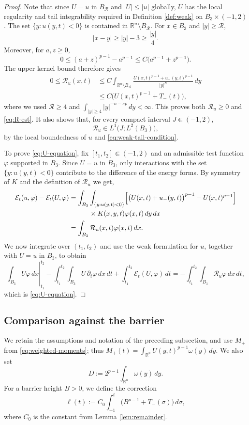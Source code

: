 \documentclass[10pt]{amsart}
\theoremstyle{plain}
\theoremstyle{definition}
\theoremstyle{remark}
\numberwithin{equation}{section}
\newcommand{\R}{\mathbb R}
\begin{document}
\begin{proof}
Note that since $U=u$ in $B_{\mathcal R}$ and $|U|\le|u|$ globally, $U$ has
the local regularity and tail integrability required in
Definition \ref{def:weak} on $B_3\times(-1,2)$.
The set $\{y:u(y,t)<0\}$ is contained in
$\R^n\setminus B_{\mathcal R}$. For $x\in B_3$ and $|y|\ge\mathcal R$,
\[
|x-y|\ge |y|-3\ge\frac{|y|}{4}.
\]
Moreover, for $a,z\ge0$,
\[
0\le(a+z)^{p-1}-a^{p-1}
\le C\bigl(a^{p-1}+z^{p-1}\bigr).
\]
The upper kernel bound therefore gives
\begin{align*}
0\le\mathcal R_u(x,t)
&\le C\int_{\R^n\setminus B_{\mathcal R}}
\frac{U(x,t)^{p-1}+u_-(y,t)^{p-1}}{|y|^N}\,dy\\
&\le C\bigl(U(x,t)^{p-1}+T_-(t)\bigr),
\end{align*}
where we used $\mathcal R\ge4$ and
$\int_{|y|\ge4}|y|^{-n-sp}\,dy<\infty$.
This proves both $\mathcal R_u\ge0$ and \eqref{eq:R-est}.
It also shows that, for every compact interval $J\Subset(-1,2)$,
\[
\mathcal R_u\in L^1\bigl(J;L^2(B_3)\bigr),
\]
by the local boundedness of $u$ and \eqref{eq:weak-tail-condition}.

To prove \eqref{eq:U-equation}, fix $[t_1,t_2]\Subset(-1,2)$ and
an admissible test function $\varphi$ supported
in $B_3$.
Since $U=u$ in $B_3$, only interactions with the set
$\{y:u(y,t)<0\}$ contribute to the difference of the energy forms.
By symmetry of $K$ and the definition of $\mathcal R_u$ we get,
\begin{align*}
\mathcal E_t(u,\varphi)-\mathcal E_t(U,\varphi)
&=\int_{B_3}\int_{\{y:u(y,t)<0\}}
\Bigl[\bigl(U(x,t)+u_-(y,t)\bigr)^{p-1}
-U(x,t)^{p-1}\Bigr]\\
&\hspace{3em}\times K(x,y,t)\varphi(x,t)\,dy\,dx\\
&=\int_{B_3}\mathcal R_u(x,t)\varphi(x,t)\,dx.
\end{align*}
We now integrate over $(t_1,t_2)$ and use the weak
formulation for $u$, together with $U=u$ in $B_3$, to obtain
\[
\left.\int_{B_3}U\varphi\,dx\right|_{t_1}^{t_2}
-\int_{t_1}^{t_2}\int_{B_3}U\,\partial_t\varphi\,dx\,dt
+\int_{t_1}^{t_2}\mathcal E_t(U,\varphi)\,dt
=-\int_{t_1}^{t_2}\int_{B_3}\mathcal R_u\varphi\,dx\,dt,
\]
which is \eqref{eq:U-equation}. 
\end{proof}

\subsection{Comparison against the barrier}
We retain the assumptions and notation of the preceding subsection,
and use $M_+$ from \eqref{eq:weighted-moments}; thus
$M_+(t)=\int_{\R^n}U(y,t)^{p-1}\omega(y)\,dy$.
We also set
\[
    D
    :=
    2^{p-1}\int_{\R^n}\omega(y)\,dy.
\]
For a barrier height $B>0$, we define the correction
\begin{equation}\label{eq:ell-def}
\ell(t)
:=
C_0
\int_{-1}^t
\bigl(B^{p-1}+T_-(\sigma)\bigr)\,d\sigma,
\end{equation}
where $C_0$ is the constant from Lemma \ref{lem:remainder}.
\end{document}
